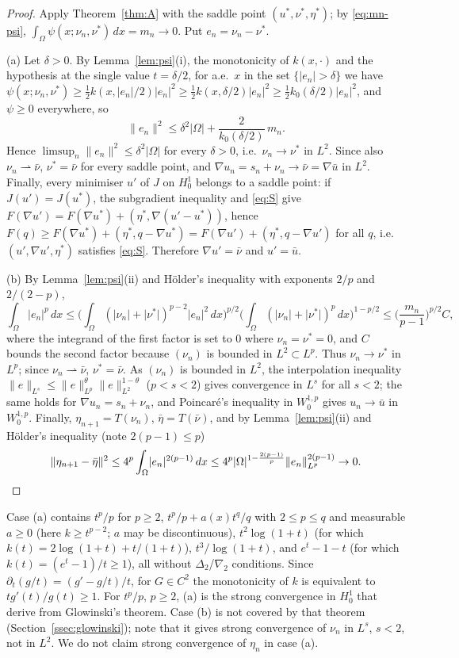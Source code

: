 \documentclass[11pt]{amsart}
\theoremstyle{definition}
\theoremstyle{remark}
\numberwithin{equation}{section}
\newcommand{\dx}{\,dx}
\newcommand{\abs}[1]{\lvert #1\rvert}
\newcommand{\norm}[1]{\lVert #1\rVert}
\newcommand{\weak}{\rightharpoonup}
\begin{document}
\begin{proof}
Apply Theorem~\ref{thm:A} with the saddle point $(u^*,\nu^*,\eta^*)$; by \eqref{eq:mn-psi}, $\int_\Omega\psi(x;\nu_n,\nu^*)\dx=m_n\to0$. Put $e_n=\nu_n-\nu^*$.

(a) Let $\delta>0$. By Lemma~\ref{lem:psi}(i), the monotonicity of $k(x,\cdot)$ and the hypothesis at the single value $t=\delta/2$, for a.e.\ $x$ in the set $\{\abs{e_n}>\delta\}$ we have $\psi(x;\nu_n,\nu^*)\ge\frac12k(x,\abs{e_n}/2)\abs{e_n}^2\ge\frac12k(x,\delta/2)\abs{e_n}^2\ge\frac12k_0(\delta/2)\abs{e_n}^2$, and $\psi\ge0$ everywhere, so
\[
\norm{e_n}^2\le\delta^2\abs\Omega+\frac2{k_0(\delta/2)}\,m_n .
\]
Hence $\limsup_n\norm{e_n}^2\le\delta^2\abs\Omega$ for every $\delta>0$, i.e.\ $\nu_n\to\nu^*$ in $L^2$. Since also $\nu_n\weak\bar\nu$, $\nu^*=\bar\nu$ for every saddle point, and $\nabla u_n=s_n+\nu_n\to\bar\nu=\nabla\bar u$ in $L^2$. Finally, every minimiser $u'$ of $J$ on $H^1_0$ belongs to a saddle point: if $J(u')=J(u^*)$, the subgradient inequality and \eqref{eq:S} give $F(\nabla u')=F(\nabla u^*)+(\eta^*,\nabla(u'-u^*))$, hence $F(q)\ge F(\nabla u^*)+(\eta^*,q-\nabla u^*)=F(\nabla u')+(\eta^*,q-\nabla u')$ for all $q$, i.e.\ $(u',\nabla u',\eta^*)$ satisfies \eqref{eq:S}. Therefore $\nabla u'=\bar\nu$ and $u'=\bar u$.

(b) By Lemma~\ref{lem:psi}(ii) and H\"older's inequality with exponents $2/p$ and $2/(2-p)$,
\[
\int_\Omega\abs{e_n}^p\dx\le\Big(\int_\Omega(\abs{\nu_n}+\abs{\nu^*})^{p-2}\abs{e_n}^2\dx\Big)^{p/2}\Big(\int_\Omega(\abs{\nu_n}+\abs{\nu^*})^p\dx\Big)^{1-p/2}\le\Big(\frac{m_n}{p-1}\Big)^{p/2}C ,
\]
where the integrand of the first factor is set to $0$ where $\nu_n=\nu^*=0$, and $C$ bounds the second factor because $(\nu_n)$ is bounded in $L^2\subset L^p$. Thus $\nu_n\to\nu^*$ in $L^p$; since $\nu_n\weak\bar\nu$, $\nu^*=\bar\nu$. As $(\nu_n)$ is bounded in $L^2$, the interpolation inequality $\norm{e}_{L^s}\le\norm e_{L^p}^\theta\norm e_{L^2}^{1-\theta}$ ($p<s<2$) gives convergence in $L^s$ for all $s<2$; the same holds for $\nabla u_n=s_n+\nu_n$, and Poincar\'e's inequality in $W^{1,p}_0$ gives $u_n\to\bar u$ in $W^{1,p}_0$. Finally, $\eta_{n+1}=T(\nu_n)$, $\bar\eta=T(\bar\nu)$, and by Lemma~\ref{lem:psi}(ii) and H\"older's inequality (note $2(p-1)\le p$)
\[
\norm{\eta_{n+1}-\bar\eta}^2\le4^p\int_\Omega\abs{e_n}^{2(p-1)}\dx\le4^p\abs\Omega^{1-\frac{2(p-1)}p}\norm{e_n}_{L^p}^{2(p-1)}\to0 .\qedhere
\]
\end{proof}

Case (a) contains $t^p/p$ for $p\ge2$, $t^p/p+a(x)t^q/q$ with $2\le p\le q$ and measurable $a\ge0$ (here $k\ge t^{p-2}$; $a$ may be discontinuous), $t^2\log(1+t)$ (for which $k(t)=2\log(1+t)+t/(1+t)$), $t^3/\log(1+t)$, and $e^t-1-t$ (for which $k(t)=(e^t-1)/t\ge1$), all without $\Delta_2$/$\nabla_2$ conditions. Since $\partial_t(g/t)=(g'-g/t)/t$, for $G\in C^2$ the monotonicity of $k$ is equivalent to $tg'(t)/g(t)\ge1$. For $t^p/p$, $p\ge2$, (a) is the strong convergence in $H^1_0$ that \cite{AragonFBRubio2023} derive from Glowinski's theorem. Case (b) is not covered by that theorem (Section~\ref{ssec:glowinski}); note that it gives strong convergence of $\nu_n$ in $L^s$, $s<2$, not in $L^2$. We do not claim strong convergence of $\eta_n$ in case (a).
\end{document}

